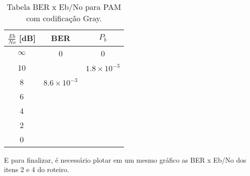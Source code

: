 \begin{small}
    \begin{table}[H]
        \begin{center}
            \caption{Tabela BER x Eb/No para PAM com codificação Gray.}
            \begin{tabular}{c|c|c}
                \hline
                $\frac{Eb}{No}$ [dB] & BER & $P_b$ \\
                \hline
                $\infty$ & 0 & 0 \\
                \hline
                10 & & $1.8 \times 10^{-3}$\\
                \hline
                8 & $8.6 \times 10^{-3}$ & \\
                \hline
                6 & & \\
                \hline
                4 & & \\
                \hline
                2 & & \\
                \hline
                0 & & \\
                \hline
            \end{tabular}
            \label{tab:1}
        \end{center}
    \end{table}
\end{small}


E para finalizar, é necessário plotar em um mesmo gráfico as BER x Eb/No dos itens 2 e 4 do roteiro.
